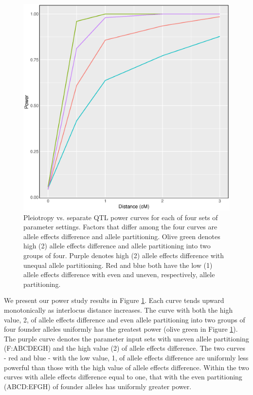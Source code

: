 \documentclass[12pt,twoside, lineno]{gsajnl}
\begin{document}
\begin{figure}
\includegraphics[width = \textwidth]{../R/power-curves.eps}
\caption{Pleiotropy vs. separate QTL power curves for each of four sets of parameter settings. Factors that differ among the four curves are allele effects difference and allele partitioning. Olive green denotes high (2) allele effects difference and allele partitioning into two groups of four. Purple denotes high (2) allele effects difference with unequal allele partitioning. Red and blue both have the low (1) allele effects difference with even and uneven, respectively, allele partitioning.}
\label{fig:power}
\end{figure}

We present our power study results in Figure \ref{fig:power}. Each curve tends upward monotonically as interlocus distance increases. The curve with both the high value, 2, of allele effects difference and even allele partitioning into two groups of four founder alleles uniformly has the greatest power (olive green in Figure \ref{fig:power}). The purple curve denotes the parameter input sets with uneven allele partitioning (F:ABCDEGH) and the high value (2) of allele effects difference. The two curves - red and blue - with the low value, 1, of allele effects difference are uniformly less powerful than those with the high value of allele effects difference. Within the two curves with allele effects difference equal to one, that with the even partitioning (ABCD:EFGH) of founder alleles has uniformly greater power.
\end{document}
